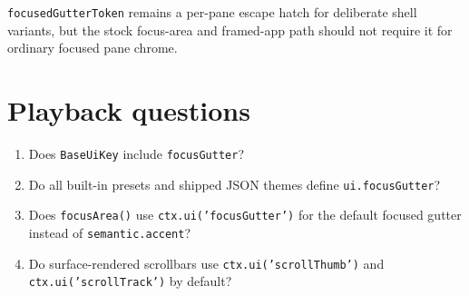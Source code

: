 \texttt{f\allowbreak{}o\allowbreak{}c\allowbreak{}u\allowbreak{}s\allowbreak{}e\allowbreak{}d\allowbreak{}G\allowbreak{}u\allowbreak{}t\allowbreak{}t\allowbreak{}e\allowbreak{}r\allowbreak{}T\allowbreak{}o\allowbreak{}k\allowbreak{}e\allowbreak{}n} remains a per-pane escape hatch for deliberate shell variants, but the stock focus-area and framed-app path should not require it for ordinary focused pane chrome.

\section{Playback questions}\label{record-177-playback-questions}

\begin{enumerate}
\def\labelenumi{\arabic{enumi}.}
\tightlist
\item
  Does \texttt{B\allowbreak{}a\allowbreak{}s\allowbreak{}e\allowbreak{}U\allowbreak{}i\allowbreak{}K\allowbreak{}e\allowbreak{}y} include \texttt{f\allowbreak{}o\allowbreak{}c\allowbreak{}u\allowbreak{}s\allowbreak{}G\allowbreak{}u\allowbreak{}t\allowbreak{}t\allowbreak{}e\allowbreak{}r}?
\item
  Do all built-in presets and shipped JSON themes define \texttt{u\allowbreak{}i\allowbreak{}.\allowbreak{}f\allowbreak{}o\allowbreak{}c\allowbreak{}u\allowbreak{}s\allowbreak{}G\allowbreak{}u\allowbreak{}t\allowbreak{}t\allowbreak{}e\allowbreak{}r}?
\item
  Does \texttt{f\allowbreak{}o\allowbreak{}c\allowbreak{}u\allowbreak{}s\allowbreak{}A\allowbreak{}r\allowbreak{}e\allowbreak{}a\allowbreak{}(\allowbreak{})} use \texttt{c\allowbreak{}t\allowbreak{}x\allowbreak{}.\allowbreak{}u\allowbreak{}i\allowbreak{}(\allowbreak{}'\allowbreak{}f\allowbreak{}o\allowbreak{}c\allowbreak{}u\allowbreak{}s\allowbreak{}G\allowbreak{}u\allowbreak{}t\allowbreak{}t\allowbreak{}e\allowbreak{}r\allowbreak{}'\allowbreak{})} for the default focused gutter instead of \texttt{s\allowbreak{}e\allowbreak{}m\allowbreak{}a\allowbreak{}n\allowbreak{}t\allowbreak{}i\allowbreak{}c\allowbreak{}.\allowbreak{}a\allowbreak{}c\allowbreak{}c\allowbreak{}e\allowbreak{}n\allowbreak{}t}?
\item
  Do surface-rendered scrollbars use \texttt{c\allowbreak{}t\allowbreak{}x\allowbreak{}.\allowbreak{}u\allowbreak{}i\allowbreak{}(\allowbreak{}'\allowbreak{}s\allowbreak{}c\allowbreak{}r\allowbreak{}o\allowbreak{}l\allowbreak{}l\allowbreak{}T\allowbreak{}h\allowbreak{}u\allowbreak{}m\allowbreak{}b\allowbreak{}'\allowbreak{})} and \texttt{c\allowbreak{}t\allowbreak{}x\allowbreak{}.\allowbreak{}u\allowbreak{}i\allowbreak{}(\allowbreak{}'\allowbreak{}s\allowbreak{}c\allowbreak{}r\allowbreak{}o\allowbreak{}l\allowbreak{}l\allowbreak{}T\allowbreak{}r\allowbreak{}a\allowbreak{}c\allowbreak{}k\allowbreak{}'\allowbreak{})} by default?

\end{enumerate}
